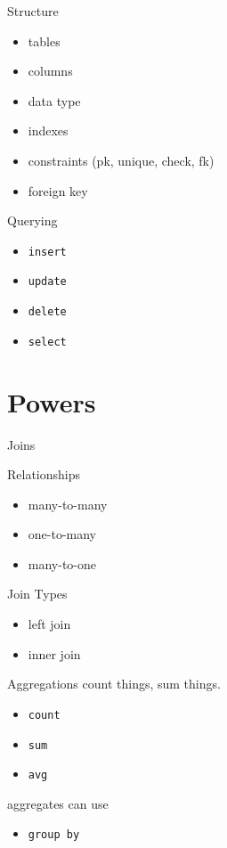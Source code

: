 \documentclass[presentation]{beamer}
\begin{document}
\begin{frame}[label={sec:orge4ee224}]{Structure}
\begin{itemize}
\item tables
\item columns
\item data type
\item indexes
\item constraints (pk, unique, check, fk)
\item foreign key
\end{itemize}
\end{frame}

\begin{frame}[label={sec:org2c5e5ef},fragile]{Querying}
 \begin{itemize}
\item \texttt{insert}
\item \texttt{update}
\item \texttt{delete}
\item \texttt{select}
\end{itemize}
\end{frame}

\section{Powers}
\label{sec:orga9b6b65}

\begin{frame}[label={sec:org53230ad}]{Joins}
\begin{block}{Relationships}
\begin{itemize}
\item many-to-many
\item one-to-many
\item many-to-one
\end{itemize}
\end{block}

\begin{block}{Join Types}
\begin{itemize}
\item left join
\item inner join
\end{itemize}
\end{block}
\end{frame}

\begin{frame}[label={sec:orgad5a242},fragile]{Aggregations}
 count things, sum things.

\begin{itemize}
\item \texttt{count}
\item \texttt{sum}
\item \texttt{avg}
\end{itemize}

aggregates can use

\begin{itemize}
\item \texttt{group by}
\end{itemize}
\end{frame}
\end{document}
